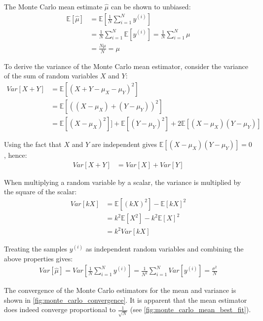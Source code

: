 \documentclass[a4paper]{article}
\begin{document}
The Monte Carlo mean estimate $\hat{\mu}$ can be shown to unbiased:
\begin{align*}
    \mathbb{E}[\hat{\mu}] & = \mathbb{E}\left[\frac{1}{N} \sum_{i=1}^N y^{(i)}\right] \\
    &= \frac{1}{N} \sum_{i=1}^N \mathbb{E}\left[y^{(i)}\right] = \frac{1}{N} \sum_{i=1}^N \mu \\
    &= \frac{N\mu}{N} = \mu
\end{align*}

To derive the variance of the Monte Carlo mean estimator, consider the variance of the sum of random variables $X$ and
$Y$:
\begin{align*}
    Var[X+Y]
    &= \mathbb{E}\left[(X + Y - \mu_X - \mu_Y)^2\right] \\
    &= \mathbb{E}\left[((X - \mu_X) + (Y - \mu_Y))^2\right] \\
    &= \mathbb{E}\left[(X-\mu_X)^2\right]] + \mathbb{E}\left[(Y-\mu_Y)^2\right] + 2\mathbb{E}\left[(X-\mu_X)(Y-\mu_Y)\right]
\end{align*}

Using the fact that $X$ and $Y$ are independent gives $\mathbb{E}\left[(X-\mu_X)(Y-\mu_Y)\right] = 0$, hence:
\begin{align*}
    Var[X+Y] & = Var[X] + Var[Y]
\end{align*}

When multiplying a random variable by a scalar, the variance is multiplied by the square of the scalar:
\begin{align*}
    Var[kX]
    &= \mathbb{E}\left[(kX)^2\right] - \mathbb{E}[kX]^2 \\
    &= k^2 \mathbb{E}\left[X^2\right] - k^2\mathbb{E}[X]^2 \\
    &= k^2 Var[kX]
\end{align*}

Treating the samples $y^{(i)}$ as independent random variables and combining the above properties gives:
\begin{align*}
    Var[\hat{\mu}] = Var\left[ \frac{1}{N}\sum_{i=1}^N y^{(i)} \right]
    = \frac{1}{N^2} \sum_{i=1}^N Var\left[y^{(i)}\right] = \frac{\sigma^2}{N}
\end{align*}

The convergence of the Monte Carlo estimators for the mean and variance is shown in \autoref{fig:monte_carlo_convergence}.
It is apparent that the mean estimator does indeed converge proportional to $\frac{1}{\sqrt{N}}$
(see \autoref{fig:monte_carlo_mean_best_fit}).
\end{document}
